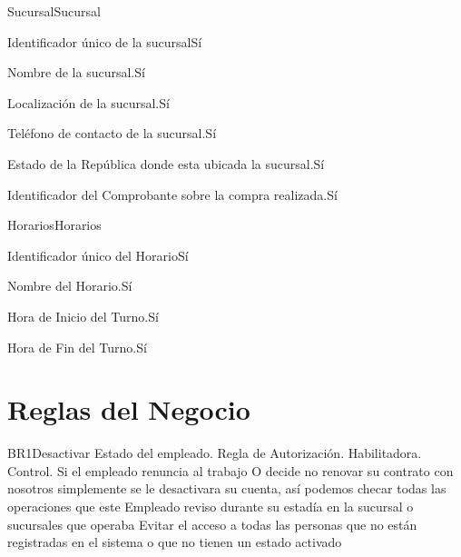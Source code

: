 \begin{cdtEntidad}{Sucursal}{Sucursal}

		{Identificador único de la sucursal}{Sí}
		
		{Nombre de la sucursal.}{Sí}

		{Localización de la sucursal.}{Sí}
	
		{Teléfono de contacto de la sucursal.}{Sí}
		
		{Estado de la República donde esta ubicada la sucursal.}{Sí}
		
		{Identificador del Comprobante sobre la compra realizada.}{Sí}	
\cdtEntityRelSection

\end{cdtEntidad}

\begin{cdtEntidad}{Horarios}{Horarios}

		{Identificador único del Horario}{Sí}
		
		{Nombre del Horario.}{Sí}

		{Hora de Inicio del Turno.}{Sí}
	
		{Hora de Fin del Turno.}{Sí}
		
\end{cdtEntidad}




\newpage
\section{Reglas del Negocio}
\begin{BussinesRule}{BR1}{Desactivar Estado del empleado.}
	\BRitem[Tipo:] Regla de Autorización. 
	\BRitem[Clase:] Habilitadora. 
	\BRitem[Nivel:] Control. %
	\BRitem[Descripción:] Si el empleado renuncia al trabajo O decide no renovar su contrato con nosotros simplemente se le desactivara su cuenta, así podemos checar todas las operaciones que este Empleado reviso durante su estadía en la sucursal o sucursales que operaba
	\BRitem[Motivación:] Evitar el acceso a todas las personas que no están registradas en el sistema o que no tienen un estado activado 
\end{BussinesRule}

